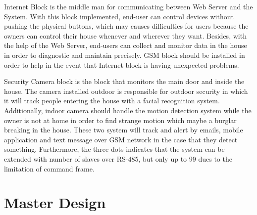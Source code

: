     Internet Block is the middle man for communicating between Web Server and the System. With this block implemented, end-user can control devices without pushing the physical buttons, which may causes difficulties for users because the owners can control their house whenever and wherever they want. Besides, with the help of the Web Server, end-users can collect and monitor data in the house in order to diagnostic and maintain precisely. GSM block should be installed in order to help in the event that Internet block is having unexpected problems.

    Security Camera block is the block that monitors the main door and inside the house. The camera installed outdoor is responsible for outdoor security in which it will track people entering the house with a facial recognition system. Additionally, indoor camera should handle the motion detection system while the owner is not at home in order to find strange motion which maybe a burglar breaking in the house. These two system will track and alert by emails, mobile application and text message over GSM network in the case that they detect something. Furthermore, the three-dots indicates that the system can be extended with number of slaves over RS-485, but only up to 99 dues to the limitation of command frame.
\section{Master Design}\label{masterDesign}
